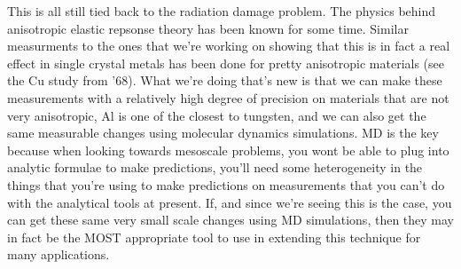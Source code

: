 

This is all still tied back to the radiation damage problem. The physics behind anisotropic elastic repsonse theory has been known for some time. Similar measurments to the ones that we're working on showing that this is in fact a real effect in single crystal metals has been done for pretty anisotropic materials (see the Cu study from '68). What we're doing that's new is that we can make these measurements with a relatively high degree of precision on materials that are not very anisotropic, Al is one of the closest to tungsten, and we can also get the same measurable changes using molecular dynamics simulations. MD is the key because when looking towards mesoscale problems, you wont be able to plug into analytic formulae to make predictions, you'll need some heterogeneity in the things that you're using to make predictions on measurements that you can't do with the analytical tools at present. If, and since we're seeing this is the case, you can get these same very small scale changes using MD simulations, then they may in fact be the MOST appropriate tool to use in extending this technique for many applications.